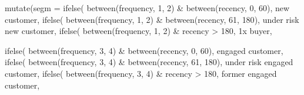 \documentclass[
]{book}
\newenvironment{Shaded}{\begin{snugshade}}{\end{snugshade}}
\newcommand{\AttributeTok}[1]{\textcolor[rgb]{0.77,0.63,0.00}{#1}}
\newcommand{\DecValTok}[1]{\textcolor[rgb]{0.00,0.00,0.81}{#1}}
\newcommand{\FunctionTok}[1]{\textcolor[rgb]{0.00,0.00,0.00}{#1}}
\newcommand{\NormalTok}[1]{#1}
\newcommand{\SpecialCharTok}[1]{\textcolor[rgb]{0.00,0.00,0.00}{#1}}
\newcommand{\StringTok}[1]{\textcolor[rgb]{0.31,0.60,0.02}{#1}}
\begin{document}
\begin{Shaded}
\begin{Highlighting}[]
        \FunctionTok{mutate}\NormalTok{(}\AttributeTok{segm =}
                   \FunctionTok{ifelse}\NormalTok{(}
                       \FunctionTok{between}\NormalTok{(frequency, }\DecValTok{1}\NormalTok{, }\DecValTok{2}\NormalTok{) }\SpecialCharTok{\&} \FunctionTok{between}\NormalTok{(recency, }\DecValTok{0}\NormalTok{, }\DecValTok{60}\NormalTok{),}
                       \StringTok{\textquotesingle{}new customer\textquotesingle{}}\NormalTok{,}
                       \FunctionTok{ifelse}\NormalTok{(}
                           \FunctionTok{between}\NormalTok{(frequency, }\DecValTok{1}\NormalTok{, }\DecValTok{2}\NormalTok{) }\SpecialCharTok{\&}
                               \FunctionTok{between}\NormalTok{(recency, }\DecValTok{61}\NormalTok{, }\DecValTok{180}\NormalTok{),}
                           \StringTok{\textquotesingle{}under risk new customer\textquotesingle{}}\NormalTok{,}
                           \FunctionTok{ifelse}\NormalTok{(}
                               \FunctionTok{between}\NormalTok{(frequency, }\DecValTok{1}\NormalTok{, }\DecValTok{2}\NormalTok{) }\SpecialCharTok{\&}\NormalTok{ recency }\SpecialCharTok{\textgreater{}} \DecValTok{180}\NormalTok{,}
                               \StringTok{\textquotesingle{}1x buyer\textquotesingle{}}\NormalTok{,}
                               
                               \FunctionTok{ifelse}\NormalTok{(}
                                   \FunctionTok{between}\NormalTok{(frequency, }\DecValTok{3}\NormalTok{, }\DecValTok{4}\NormalTok{) }\SpecialCharTok{\&}
                                       \FunctionTok{between}\NormalTok{(recency, }\DecValTok{0}\NormalTok{, }\DecValTok{60}\NormalTok{),}
                                   \StringTok{\textquotesingle{}engaged customer\textquotesingle{}}\NormalTok{,}
                                   \FunctionTok{ifelse}\NormalTok{(}
                                       \FunctionTok{between}\NormalTok{(frequency, }\DecValTok{3}\NormalTok{, }\DecValTok{4}\NormalTok{) }\SpecialCharTok{\&}
                                           \FunctionTok{between}\NormalTok{(recency, }\DecValTok{61}\NormalTok{, }\DecValTok{180}\NormalTok{),}
                                       \StringTok{\textquotesingle{}under risk engaged customer\textquotesingle{}}\NormalTok{,}
                                       \FunctionTok{ifelse}\NormalTok{(}
                                           \FunctionTok{between}\NormalTok{(frequency, }\DecValTok{3}\NormalTok{, }\DecValTok{4}\NormalTok{) }\SpecialCharTok{\&}\NormalTok{ recency }\SpecialCharTok{\textgreater{}} \DecValTok{180}\NormalTok{,}
                                           \StringTok{\textquotesingle{}former engaged customer\textquotesingle{}}\NormalTok{,}
                                           

\end{Highlighting}
\end{Shaded}
\end{document}

